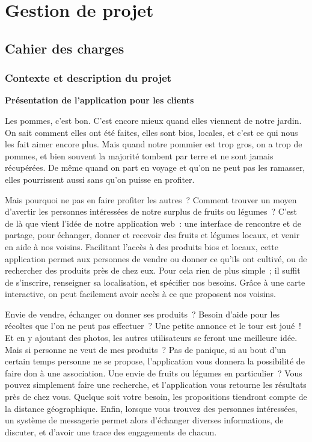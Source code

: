 \documentclass{article}
\begin{document}
\newpage
\section{Gestion de projet}

\vspace{8mm}
\subsection{Cahier des charges}

\subsubsection{Contexte et description du projet}

\vspace{1cm}
\textbf{Présentation de l'application pour les clients}

Les pommes, c'est bon. C'est encore mieux quand elles viennent de notre jardin. On sait comment elles ont été faites, elles sont bios, locales, et c'est ce qui nous les fait aimer encore plus. Mais quand notre pommier est trop gros, on a trop de pommes, et bien souvent la majorité tombent par terre et ne sont jamais récupérées. De même quand on part en voyage et qu'on ne peut pas les ramasser, elles pourrissent aussi sans qu'on puisse en profiter.

Mais pourquoi ne pas en faire profiter les autres ? Comment trouver un moyen d'avertir les personnes intéressées de notre surplus de fruits ou légumes ? C'est de là que vient l'idée de notre application web : une interface de rencontre et de partage, pour échanger, donner et recevoir des fruits et légumes locaux, et venir en aide à nos voisins.
Facilitant l'accès à des produits bios et locaux, cette application permet aux personnes de vendre ou donner ce qu'ils ont cultivé, ou de rechercher des produits près de chez eux. Pour cela rien de plus simple ; il suffit de s'inscrire, renseigner sa localisation, et spécifier nos besoins. Grâce à une carte interactive, on peut facilement avoir accès à ce que proposent nos voisins.

Envie de vendre, échanger ou donner ses produits ? Besoin d'aide pour les récoltes que l'on ne peut pas effectuer ? Une petite annonce et le tour est joué ! Et en y ajoutant des photos, les autres utilisateurs se feront une meilleure idée. Mais si personne ne veut de mes produits ? Pas de panique, si au bout d'un certain temps personne ne se propose, l'application vous donnera la possibilité de faire don à une association.
Une envie de fruits ou légumes en particulier ? Vous pouvez simplement faire une recherche, et l'application vous retourne les résultats près de chez vous. Quelque soit votre besoin, les propositions tiendront compte de la distance géographique.
Enfin, lorsque vous trouvez des personnes intéressées, un système de messagerie permet alors d'échanger diverses informations, de discuter, et d'avoir une trace des engagements de chacun.
\end{document}
